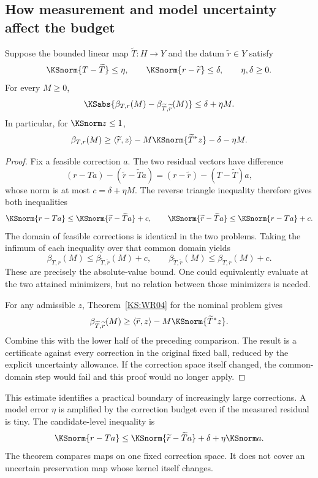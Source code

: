 \subsection{How measurement and model uncertainty affect the budget}
\begin{KStheorem}\label{KS:WR05}
Suppose the bounded linear map $\widetilde T:H\to Y$ and the datum $\widetilde r\in Y$ satisfy
\[
 \KSnorm{T-\widetilde T}\le\eta,\qquad
 \KSnorm{r-\widetilde r}\le\delta,\qquad\eta,\delta\ge0.
\]
For every $M\ge0$,
\[
 \KSabs{\beta_{T,r}(M)-\beta_{\widetilde T,\widetilde r}(M)}
 \le\delta+\eta M.
\]
In particular, for $\KSnorm z\le1$,
\[
 \beta_{T,r}(M)\ge
 \langle\widetilde r,z\rangle-M\KSnorm{\widetilde T^*z}
       -\delta-\eta M.
\]
\end{KStheorem}
\begin{proof}
Fix a feasible correction $a$. The two residual vectors have difference
\[
 (r-Ta)-(\widetilde r-\widetilde Ta)
 =(r-\widetilde r)-(T-\widetilde T)a,
\]
whose norm is at most $c=\delta+\eta M$. The reverse triangle inequality therefore gives both inequalities
\[
 \KSnorm{r-Ta}\le\KSnorm{\widetilde r-\widetilde Ta}+c,
 \qquad
 \KSnorm{\widetilde r-\widetilde Ta}\le\KSnorm{r-Ta}+c.
\]
The domain of feasible corrections is identical in the two problems. Taking the infimum of each inequality over that common domain yields
\[
 \beta_{T,r}(M)\le\beta_{\widetilde T,\widetilde r}(M)+c,
 \qquad
 \beta_{\widetilde T,\widetilde r}(M)\le\beta_{T,r}(M)+c.
\]
These are precisely the absolute-value bound. One could equivalently evaluate at the two attained minimizers, but no relation between those minimizers is needed.

For any admissible $z$, Theorem~\ref{KS:WR04} for the nominal problem gives
\[
 \beta_{\widetilde T,\widetilde r}(M)
 \ge\langle\widetilde r,z\rangle-M\KSnorm{\widetilde T^*z}.
\]
Combine this with the lower half of the preceding comparison. The result is a certificate against every correction in the original fixed ball, reduced by the explicit uncertainty allowance. If the correction space itself changed, the common-domain step would fail and this proof would no longer apply.
\end{proof}

This estimate identifies a practical boundary of increasingly large corrections. A model error $\eta$ is amplified by the correction budget even if the measured residual is tiny. The candidate-level inequality is
\[
 \KSnorm{r-Ta}\le\KSnorm{\widetilde r-\widetilde Ta}+\delta+\eta\KSnorm a.
\]
The theorem compares maps on one fixed correction space. It does not cover an uncertain preservation map whose kernel itself changes.

